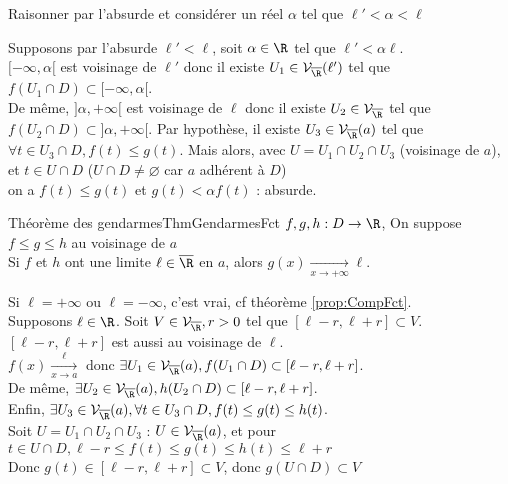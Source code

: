 \documentclass[12pt,a4paper]{report}
\begin{document}
\begin{principedemo}{}
Raisonner par l'absurde et considérer un réel $\alpha$ tel que $\ell' < \alpha < \ell$
\end{principedemo}

\begin{demo}{}
Supposons par l'absurde $\ell' < \ell$, soit $\alpha \in \R$ tel que $\ell' < \alpha \ell$. \\
$[-\infty, \alpha[$ est voisinage de $\ell'$ donc il existe $U_1 \in \mathcal{V}_{\overline{\R}}(\ell')$ tel que $f(U_1 \cap D) \subset [-\infty,\alpha[$. \\
De même, $]\alpha,+\infty[$ est voisinage de $\ell$ donc il existe $U_2 \in \mathcal{V}_{\overline{\R}}$ tel que $f(U_2 \cap D) \subset ]\alpha,+\infty[$.
Par hypothèse, il existe $U_3 \in \mathcal{V}_{\overline{\R}}(a)$ tel que $\forall t \in U_3 \cap D, f(t) \leq g(t)$.
Mais alors, avec $U = U_1 \cap U_2 \cap U_3$ (voisinage de $a$), et $t \in U \cap D$ ($U \cap D \neq \varnothing$ car $a$ adhérent à $D$) \\
on a $f(t) \leq g(t)$ et $g(t) < \alpha f(t)$ : absurde.
\end{demo}

\begin{theoreme}{Théorème des gendarmes}{ThmGendarmesFct}
$f,g,h : D \to \R$, On suppose $f \leq g \leq h$ au voisinage de $a$ \\
Si $f$ et $h$ ont une limite $\ell \in \overline{\R}$ en $a$, alors $g(x) \xrightarrow[x \to +\infty]{} \ell$.
\end{theoreme}

\begin{demo}{}
Si $\ell = +\infty$ ou $\ell = -\infty$, c'est vrai, cf théorème \ref{prop:CompFct}. \\
Supposons $\ell \in \R$. Soit $V \in \mathcal{V}_{\overline{\R}}, r>0$ tel que $[\ell-r,\ell+r] \subset V$. \\
$[\ell-r,\ell+r]$ est aussi au voisinage de $\ell$. \\
$f(x) \xrightarrow[x \to a] \ell$ donc $\exists U_1 \in \mathcal{V}_{\overline{\R}}(a), f(U_1 \cap D) \subset [\ell-r,\ell+r]$. \\
De même, $\exists U_2 \in \mathcal{V}_{\overline{\R}}(a), h(U_2 \cap D) \subset [\ell-r,\ell+r]$. \\
Enfin, $\exists U_3 \in \mathcal{V}_{\overline{\R}}(a), \forall t \in U_3 \cap D, f(t) \leq g(t) \leq h(t)$. \\
Soit $U = U_1 \cap U_2 \cap U_3$ : $U \in \mathcal{V}_{\overline{\R}}(a)$, et pour $t \in U \cap D, \ell-r \leq f(t) \leq g(t) \leq h(t) \leq \ell+r$ \\
Donc $g(t) \in [\ell-r,\ell+r] \subset V$, donc $g(U \cap D) \subset V$
\end{demo}
\end{document}
